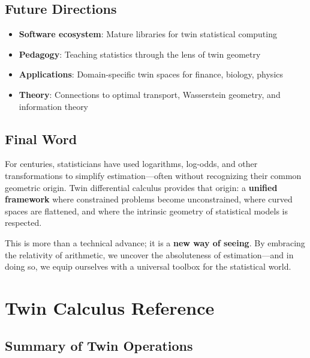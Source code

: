 \documentclass[11pt,twoside]{book}
\theoremstyle{plain}
\theoremstyle{definition}
\theoremstyle{remark}
\begin{document}
\section{Future Directions}
\label{sec:future}

\begin{itemize}
    \item \textbf{Software ecosystem}: Mature libraries for twin statistical computing
    \item \textbf{Pedagogy}: Teaching statistics through the lens of twin geometry
    \item \textbf{Applications}: Domain-specific twin spaces for finance, biology, physics
    \item \textbf{Theory}: Connections to optimal transport, Wasserstein geometry, and information theory
\end{itemize}

\section{Final Word}
\label{sec:final_word}

For centuries, statisticians have used logarithms, log-odds, and other transformations to simplify estimation—often without recognizing their common geometric origin. Twin differential calculus provides that origin: a \textbf{unified framework} where constrained problems become unconstrained, where curved spaces are flattened, and where the intrinsic geometry of statistical models is respected.

This is more than a technical advance; it is a \textbf{new way of seeing}. By embracing the relativity of arithmetic, we uncover the absoluteness of estimation—and in doing so, we equip ourselves with a universal toolbox for the statistical world.


\appendix

\chapter{Twin Calculus Reference}
\label{app:twin_reference}

\section{Summary of Twin Operations}
\label{sec:twin_ops_summary}
\end{document}
